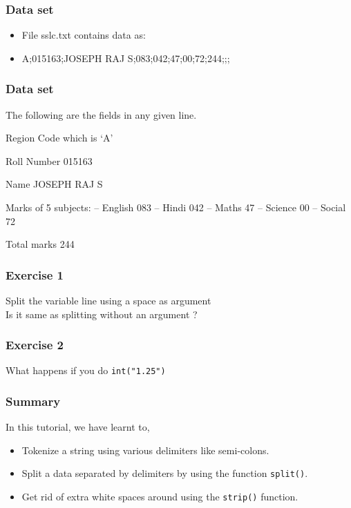 \documentclass[17pt]{beamer}
\begin{document}
\begin{frame}
\frametitle{Data set}
\begin{itemize}
\item File sslc.txt contains data as:
\item A;015163;JOSEPH RAJ S;083;042;47;00;72;244;;;
\end{itemize}

\end{frame}
\begin{frame}
\frametitle{Data set}
\label{sec-4}
  The following are the fields in any given line.
\begin{itemize}
\begin{small}
\item Region Code which is `A'
\item Roll Number 015163
\item Name JOSEPH RAJ S
\item Marks of 5 subjects: -- English 083 -- 
     Hindi 042 -- Maths 47 --
     Science 00 -- Social 72
\item Total marks 244
\end{small}
\end{itemize}
\end{frame}
\begin{frame}
\frametitle{Exercise 1}
\label{sec-5}
Split the variable line using a space as argument  \\
Is it same as splitting without an argument ?

\end{frame}

\begin{frame}
\frametitle{Exercise 2}
\label{sec-8}

  What happens if you do \texttt{int("1.25")}
\end{frame}

\begin{frame}
\frametitle{Summary}
\label{sec-9.1}
In this tutorial, we have learnt to,\pause
\begin{itemize}
\item Tokenize a string using various delimiters like semi-colons.\pause
\item Split a data separated by delimiters by using the function \texttt{split()}.\pause
\item Get rid of extra white spaces around using the \texttt{strip()} function.\pause
\end{itemize}
\end{frame}
\end{document}
